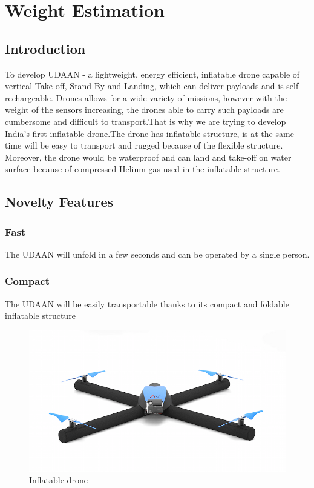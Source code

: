 \chapter{Weight Estimation}
\section{Introduction}
To develop UDAAN - a lightweight, energy efficient, inflatable drone capable of vertical Take off, Stand By and Landing, which can deliver payloads and is self rechargeable.
Drones allows for a wide variety of missions, however with the weight of the sensors increasing, the drones able to carry such payloads are cumbersome and difficult to transport.That is why we are trying to develop India's first inflatable drone.The drone has inflatable structure, is at the same time will be easy to transport and rugged because of the flexible structure. Moreover, the drone would be waterproof and can land and take-off on water surface because of compressed Helium gas used in the inflatable structure. 


\section{Novelty Features}

\subsection{Fast}

The UDAAN will unfold in a few seconds and can be operated by a single person.

\subsection{Compact}

The UDAAN will be easily transportable thanks to its compact and foldable inflatable structure

\begin{figure}[h!]
\centering
\includegraphics[width=.8\textwidth]{drone.png} 
\caption{\label{fig:drone}Inflatable drone}
\end{figure}

